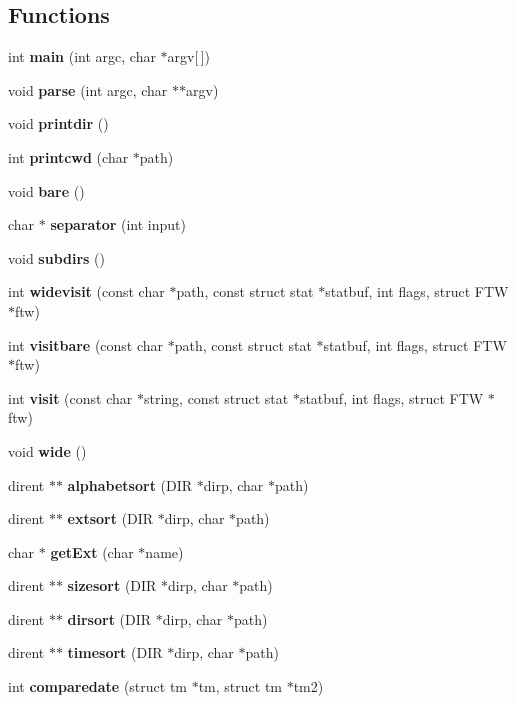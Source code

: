 \subsection*{Functions}
\begin{CompactItemize}
\item 
int {\bf main} (int argc, char $\ast$argv[$\,$])
\item 
void {\bf parse} (int argc, char $\ast$$\ast$argv)
\item 
void {\bf printdir} ()
\item 
int {\bf printcwd} (char $\ast$path)
\item 
void {\bf bare} ()
\item 
char $\ast$ {\bf separator} (int input)
\item 
void {\bf subdirs} ()
\item 
int {\bf widevisit} (const char $\ast$path, const struct stat $\ast$statbuf, int flags, struct FTW $\ast$ftw)
\item 
int {\bf visitbare} (const char $\ast$path, const struct stat $\ast$statbuf, int flags, struct FTW $\ast$ftw)
\item 
int {\bf visit} (const char $\ast$string, const struct stat $\ast$statbuf, int flags, struct FTW $\ast$ftw)
\item 
void {\bf wide} ()
\item 
dirent $\ast$$\ast$ {\bf alphabetsort} (DIR $\ast$dirp, char $\ast$path)
\item 
dirent $\ast$$\ast$ {\bf extsort} (DIR $\ast$dirp, char $\ast$path)
\item 
char $\ast$ {\bf get\-Ext} (char $\ast$name)
\item 
dirent $\ast$$\ast$ {\bf sizesort} (DIR $\ast$dirp, char $\ast$path)
\item 
dirent $\ast$$\ast$ {\bf dirsort} (DIR $\ast$dirp, char $\ast$path)
\item 
dirent $\ast$$\ast$ {\bf timesort} (DIR $\ast$dirp, char $\ast$path)
\item 
int {\bf comparedate} (struct tm $\ast$tm, struct tm $\ast$tm2)
\end{CompactItemize}
